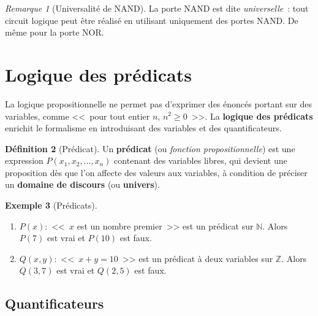 \documentclass[12pt,a4paper,openany]{book}
\theoremstyle{definition}
\newtheorem{definition}{Définition}[chapter]
\newtheorem{exemple}[definition]{Exemple}
\theoremstyle{plain}
\theoremstyle{remark}
\newtheorem{remarque}[definition]{Remarque}
\newcommand{\N}{\mathbb{N}}
\newcommand{\Z}{\mathbb{Z}}
\begin{document}
\begin{remarque}[Universalit\'e de NAND]\label{rem:nand-universel}
  La porte NAND est dite \emph{universelle}~: tout circuit logique peut \^etre r\'ealis\'e en utilisant uniquement des portes NAND. De m\^eme pour la porte NOR.
\end{remarque}

\section{Logique des pr\'edicats}
\label{sec:predicats}

La logique propositionnelle ne permet pas d'exprimer des \'enonc\'es portant sur des variables, comme <<~pour tout entier $n$, $n^2 \geq 0$~>>. La \textbf{logique des pr\'edicats} enrichit le formalisme en introduisant des variables et des quantificateurs.

\begin{definition}[Pr\'edicat]\label{def:predicat}
  Un \textbf{pr\'edicat} (ou \emph{fonction propositionnelle}) est une expression $P(x_1, x_2, \dots, x_n)$ contenant des variables libres, qui devient une proposition d\`es que l'on affecte des valeurs aux variables, \`a condition de pr\'eciser un \textbf{domaine de discours} (ou \textbf{univers}).
\end{definition}

\begin{exemple}[Pr\'edicats]\label{ex:predicats}
  \begin{enumerate}[label=(\alph*)]
    \item $P(x) :$ <<~$x$ est un nombre premier~>> est un pr\'edicat sur $\N$.
    Alors $P(7)$ est vrai et $P(10)$ est faux.
    \item $Q(x,y) :$ <<~$x + y = 10$~>> est un pr\'edicat \`a deux variables sur $\Z$.
    Alors $Q(3,7)$ est vrai et $Q(2,5)$ est faux.
  \end{enumerate}
\end{exemple}

\subsection{Quantificateurs}
\label{subsec:quantificateurs}
\end{document}
